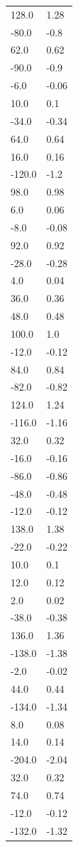 \begin{longtable}{ll}
128.0 & 1.28 \\
-80.0 & -0.8 \\
62.0 & 0.62 \\
-90.0 & -0.9 \\
-6.0 & -0.06 \\
10.0 & 0.1 \\
-34.0 & -0.34 \\
64.0 & 0.64 \\
16.0 & 0.16 \\
-120.0 & -1.2 \\
98.0 & 0.98 \\
6.0 & 0.06 \\
-8.0 & -0.08 \\
92.0 & 0.92 \\
-28.0 & -0.28 \\
4.0 & 0.04 \\
36.0 & 0.36 \\
48.0 & 0.48 \\
100.0 & 1.0 \\
-12.0 & -0.12 \\
84.0 & 0.84 \\
-82.0 & -0.82 \\
124.0 & 1.24 \\
-116.0 & -1.16 \\
32.0 & 0.32 \\
-16.0 & -0.16 \\
-86.0 & -0.86 \\
-48.0 & -0.48 \\
-12.0 & -0.12 \\
138.0 & 1.38 \\
-22.0 & -0.22 \\
10.0 & 0.1 \\
12.0 & 0.12 \\
2.0 & 0.02 \\
-38.0 & -0.38 \\
136.0 & 1.36 \\
-138.0 & -1.38 \\
-2.0 & -0.02 \\
44.0 & 0.44 \\
-134.0 & -1.34 \\
8.0 & 0.08 \\
14.0 & 0.14 \\
-204.0 & -2.04 \\
32.0 & 0.32 \\
74.0 & 0.74 \\
-12.0 & -0.12 \\
-132.0 & -1.32 \\

\end{longtable}
